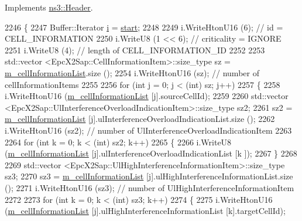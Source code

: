 Implements \hyperlink{classns3_1_1Header_afb61f1aac69ff8349a6bfe521fab5404}{ns3\+::\+Header}.


\begin{DoxyCode}
2246 \{
2247   Buffer::Iterator \hyperlink{bernuolliDistribution_8m_a6f6ccfcf58b31cb6412107d9d5281426}{i} = \hyperlink{namespacevisualizer_1_1core_a2a35e5d8a34af358b508dac8635754e0}{start};
2248 
2249   i.WriteHtonU16 (6);               \textcolor{comment}{// id = CELL\_INFORMATION}
2250   i.WriteU8 (1 << 6);               \textcolor{comment}{// criticality = IGNORE}
2251   i.WriteU8 (4);                    \textcolor{comment}{// length of CELL\_INFORMATION\_ID}
2252 
2253   std::vector <EpcX2Sap::CellInformationItem>::size\_type sz = 
      \hyperlink{classns3_1_1EpcX2LoadInformationHeader_aa998b331b688518c15219cb752eefb16}{m\_cellInformationList}.size ();
2254   i.WriteHtonU16 (sz);              \textcolor{comment}{// number of cellInformationItems}
2255 
2256   \textcolor{keywordflow}{for} (\textcolor{keywordtype}{int} j = 0; j < (int) sz; j++)
2257     \{
2258       i.WriteHtonU16 (\hyperlink{classns3_1_1EpcX2LoadInformationHeader_aa998b331b688518c15219cb752eefb16}{m\_cellInformationList} [j].sourceCellId);
2259 
2260       std::vector <EpcX2Sap::UlInterferenceOverloadIndicationItem>::size\_type sz2;
2261       sz2 = \hyperlink{classns3_1_1EpcX2LoadInformationHeader_aa998b331b688518c15219cb752eefb16}{m\_cellInformationList} [j].ulInterferenceOverloadIndicationList.size ();
2262       i.WriteHtonU16 (sz2);         \textcolor{comment}{// number of UlInterferenceOverloadIndicationItem}
2263 
2264       \textcolor{keywordflow}{for} (\textcolor{keywordtype}{int} k = 0; k < (int) sz2; k++)
2265         \{
2266           i.WriteU8 (\hyperlink{classns3_1_1EpcX2LoadInformationHeader_aa998b331b688518c15219cb752eefb16}{m\_cellInformationList} [j].ulInterferenceOverloadIndicationList [k
      ]);
2267         \}
2268 
2269       std::vector <EpcX2Sap::UlHighInterferenceInformationItem>::size\_type sz3;
2270       sz3 = \hyperlink{classns3_1_1EpcX2LoadInformationHeader_aa998b331b688518c15219cb752eefb16}{m\_cellInformationList} [j].ulHighInterferenceInformationList.size ();
2271       i.WriteHtonU16 (sz3);         \textcolor{comment}{// number of UlHighInterferenceInformationItem}
2272 
2273       \textcolor{keywordflow}{for} (\textcolor{keywordtype}{int} k = 0; k < (int) sz3; k++)
2274         \{
2275           i.WriteHtonU16 (\hyperlink{classns3_1_1EpcX2LoadInformationHeader_aa998b331b688518c15219cb752eefb16}{m\_cellInformationList} [j].ulHighInterferenceInformationList 
      [k].targetCellId);

\end{DoxyCode}
